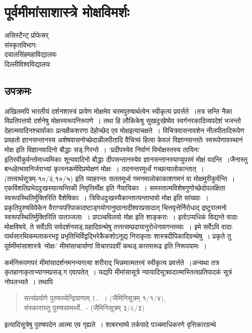 {\fontsize{15}{17}\selectfont
\presetvalues
\chapter{पूर्वमीमांसाशास्त्रे मोक्षविमर्शः}

\begin{center}
\smallskip

असिस्टैन्ट् प्रोफेसर्\\
संस्कृतविभागः\\
दयालसिंहमहाविद्यालयः\\
दिल्लीविश्वविद्यालयः
\addrule
\end{center}
 
\section*{उपक्रमः}

अखिलमपि भारतीयं दर्शनशास्त्रं प्रायेण मोक्षमेव चरमपुरुषार्थत्वेन स्वीकृत्य प्रवर्त्तते~।\break तत्र सन्ति नैका विप्रतिपत्तयो दर्शनेषु मोक्षस्वरूपनिरूपणे~। तथा हि लौकिकेषु सुख\-दुःखेष्वेव स्वर्गनरकादिव्यपदेशं भजन्तो देहात्मवादिनश्चार्वाकाः प्रत्यक्षैकशरणा देहोच्छेद एव मोक्ष\break इत्याचक्षते~। विचित्रवासनावशेन नीलपीतादिरूपेण प्रवहतो ज्ञानसन्तानस्य अशेषवासनोच्छे\-दान्नीलपीतादि वैचित्र्यं हित्वा केवलं विज्ञानसन्ततेः स्वरूपेणावस्थानं मोक्ष इति विज्ञानवादिनो बौद्धाः सड्.गिरन्ते~। ‘प्रदीपस्येव निर्वाणं विमोक्षस्तस्य तायिनः’ इतिस्वीकुर्वन्तो\break माध्यमिकाः शून्यवादिनो बौद्धाः दीपसन्तानस्येव ज्ञानसन्तानस्याप्युपरमं मोक्षं वदन्ति~।\break जैनास्तु  बन्धहेत्भावनिर्जराभ्यां कृत्स्नकर्मविप्रमोक्षणं मोक्षः~। तदनन्तरमूर्ध्वं गच्छत्या\-\break लोकान्तात्~। (तत्त्वार्थसूत्रम्-१०/२,१०/५) इति व्याहरन्तः सततमूर्ध्व गमनमालोकाकाश\-गमनं वा मोक्षमुरीकुर्वन्ति~। एकविंशतिप्रभेददुःखस्यात्यन्तिकी निवृत्तिर्मोक्ष इति नैयायिकाः~। समस्तात्मविशेषगुणोच्छेदोपलक्षिता स्वरूपस्थितिर्मुक्तिरिति वैशेषिकाः~। त्रिविधदुःखस्यैकान्तात्यन्ताभावो मोक्ष इति सांख्याः~। प्रकृतिपुरुषविवेकेन वैराग्यपरिपाकादष्टाड्गयोगानुष्ठा\-नादीश्वरप्रसादात् चित्तवृत्तेर्निरोधाद् द्रष्टुरात्मनो स्वरूपस्थितिर्मुक्तिरिति पातञ्जलाः~। प्रपञ्च\-विलयो मोक्ष इति शाङ्कराः~। इतोऽप्यधिकं विद्यन्ते वादाः मोक्षविषये, ते सर्वेऽपि सर्वदर्शनसड्.ग्रहादिग्रन्थेषु तत्तत्सम्प्रदायानुरोधेनावगन्तव्याः~। इमे सर्वेऽपि वादाः पार्थसारथिकमलाकरभट्ट प्रभृतिभिर्विद्वद्भिरेकैकशोऽनूद्य निराकृताः शास्त्रदीपिकादिग्रन्थेषु~। प्रकृते तु पूर्वमीमांसा\-शास्त्रे ‘मोक्षः’ मीमांसाचार्याणां विचारपदवीं कथड्.कारमारूढ इति निरूपयामः~। 

कर्मनिरूपणपरं मीमांसादर्शनमनन्यगत्या शरीराद् भिन्नमात्मतत्त्वं स्वीकृत्य प्रवर्त्तते~।\break अन्यथा तत्र कृतहानाकृताभ्यागमप्रसड्.ग एवापतेत्~। यद्यपि मीमांसासूत्रे न्यायादिसूत्रवदात्मास्तित्वप्रतिपादकं सूत्रं नोपलभ्यते~। तथापि 
\begin{verse}
सत्संप्रयोगे पुरुषस्येन्द्रियाणाम् 1..~। (जैमिनिसूत्रम् १/­१/४), \\
संस्कारास्तु पुरुषसामर्थ्ये.. - (जैमिनिसूत्रम् ३/­८/३) 
\end{verse}
इत्यादिसूत्रेषु पुरुषपदेन आत्मा एव गृह्यते~। शाबरभाष्ये तर्कपादे पञ्चमाधिकरणे वृत्तिकारग्रन्थे 

}
